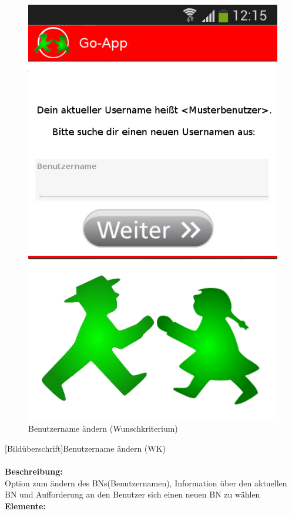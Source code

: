 \begin{figure} [H]
	\caption{Benutzername ändern (Wunschkriterium)}
	\begin{center}
		\includegraphics[scale =0.5]{resources/images/username_aendern.png}
	\end{center}
\end{figure}
[Bildüberschrift]Benutzername ändern (WK)\\ \\
\textbf{Beschreibung:}\\
Option zum ändern des BNs(Benutzernamen), Information über den aktuellen BN und Aufforderung an den Benutzer sich einen neuen BN zu wählen\\
\textbf{Elemente:}\\
